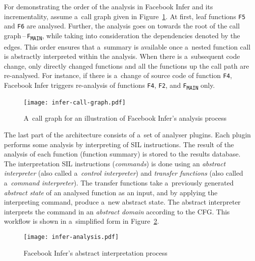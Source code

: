 \begin{example}
    \label{ex:fbinferAnalysis}
    For demonstrating the order of the analysis in Facebook Infer and its
    incrementality, assume a~call graph given in
    Figure~\ref{fig:inferCallGraph}. At first, leaf functions \texttt{F5} and
    \texttt{F6} are analysed. Further, the analysis goes on towards the root of
    the call graph\,--\,\texttt{F\textsubscript{MAIN}}, while taking into
    consideration the dependencies denoted by the edges. This order ensures
    that a~summary is available once a~nested function call is abstractly
    interpreted within the analysis. When there is a~subsequent code change,
    only directly changed functions and all the functions up the call path are
    re-analysed. For instance, if there is a~change of source code of function
    \texttt{F4}, Facebook Infer triggers re-analysis of functions \texttt{F4},
    \texttt{F2}, and \texttt{F\textsubscript{MAIN}} only.
\end{example}

\begin{figure}[hbt]
    \centering
    \texttt{[image: infer-call-graph.pdf]}
    \caption{%
        A~call graph for an illustration of Facebook Infer's analysis
        process~\cite{harmimBP, excel2019FBInfer, projectPracticeMarcin2018}%
    }
    \label{fig:inferCallGraph}
\end{figure}

The last part of the architecture consists of a~set of analyser plugins. Each
plugin performs some analysis by interpreting of SIL instructions. The result
of the analysis of each function (function summary) is stored to the results
database. The interpretation SIL instructions (\emph{commands}) is done using
an \emph{abstract interpreter} (also called a~\emph{control interpreter}) and
\emph{transfer functions} (also called a~\emph{command interpreter}). The
transfer functions take a~previously generated \emph{abstract state} of an
analysed function as an input, and by applying the interpreting command,
produce a~new abstract state. The abstract interpreter interprets the command
in an \emph{abstract domain} according to the CFG. This workflow is shown in
a~simplified form in Figure~\ref{fig:inferAnalysis}.

\begin{figure}[hbt]
    \centering
    \texttt{[image: infer-analysis.pdf]}
    \caption{%
        Facebook Infer's abstract interpretation
        process~\cite{harmimBP, projectPracticeMarcin2018}%
    }
    \label{fig:inferAnalysis}
\end{figure}

